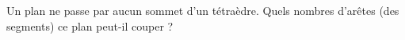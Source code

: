 Un plan ne passe par aucun sommet d'un tétraèdre. Quels nombres d'arêtes
(des segments) ce plan peut-il couper ?
